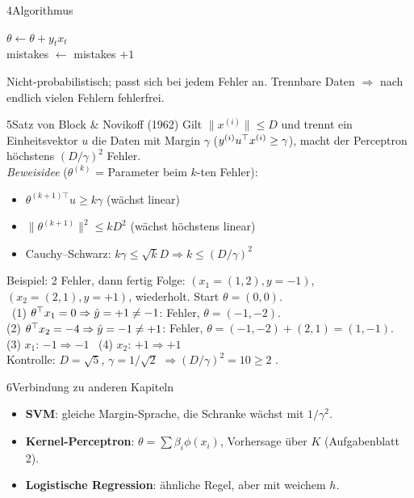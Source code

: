\begin{hngrid}
\begin{hnp}[raster multicolumn=3,acc=hnnavy]{4}{Algorithmus}
\begin{pcode}
\hiii $\theta\leftarrow\theta+y_tx_t$\\
\hiii mistakes $\leftarrow$ mistakes $+1$
\end{pcode}
Nicht-probabilistisch; passt sich bei jedem Fehler an. Trennbare Daten $\Rightarrow$ nach endlich vielen Fehlern fehlerfrei.
\end{hnp}
%
\begin{hnp}[raster multicolumn=3,acc=hngreen]{5}{Satz von Block \& Novikoff (1962)}
Gilt $\|x^{(i)}\|\le D$ und trennt ein Einheitsvektor $u$ die Daten mit Margin $\gamma$ ($y^{(i)}u^{\top} x^{(i)}\ge\gamma$), macht der Perceptron höchstens $(D/\gamma)^2$ Fehler.\\
\emph{Beweisidee} ($\theta^{(k)}$ = Parameter beim $k$-ten Fehler):
\begin{itemize}
\item $\theta^{(k+1)\top}u\ge k\gamma$ (wächst linear)
\item $\|\theta^{(k+1)}\|^2\le kD^2$ (wächst höchstens linear)
\item Cauchy--Schwarz: $k\gamma\le\sqrt kD\Rightarrow k\le(D/\gamma)^2$
\end{itemize}
\end{hnp}
%
\begin{hnex}[raster multicolumn=3]{Beispiel: 2 Fehler, dann fertig}
Folge: $(x_1{=}(1,2),y{=}-1)$, $(x_2{=}(2,1),y{=}+1)$, wiederholt. Start $\theta=(0,0)$.\\
\hnsol\ (1) $\theta^{\top} x_1=0\Rightarrow\hat y=+1\ne-1$: Fehler, $\theta=(-1,-2)$.\\
(2) $\theta^{\top} x_2=-4\Rightarrow\hat y=-1\ne+1$: Fehler, $\theta=(-1,-2)+(2,1)=(1,-1)$.\\
(3) $x_1$: $-1\Rightarrow-1$ \checkmark \ (4) $x_2$: $+1\Rightarrow+1$ \checkmark\\
Kontrolle: $D=\sqrt5$, $\gamma=1/\sqrt2$ $\Rightarrow(D/\gamma)^2=10\ge2$ .
\end{hnex}
%
\begin{hnp}[raster multicolumn=3,acc=hnrose]{6}{Verbindung zu anderen Kapiteln}
\begin{itemize}
\item \textbf{SVM}: gleiche Margin-Sprache, die Schranke wächst mit $1/\gamma^2$.
\item \textbf{Kernel-Perceptron}: $\theta=\sum\beta_i\phi(x_i)$, Vorhersage über $K$ (Aufgabenblatt 2).
\item \textbf{Logistische Regression}: ähnliche Regel, aber mit weichem $h$.
\end{itemize}

\end{hnp}
\end{hngrid}
